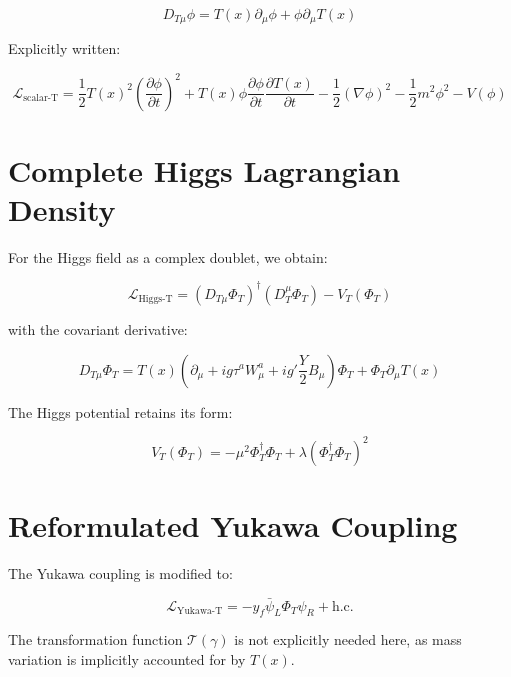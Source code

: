 \documentclass{article}
\begin{document}
	\begin{equation}
		D_{T\mu} \phi = T(x) \partial_\mu \phi + \phi \partial_\mu T(x)
	\end{equation}
	
	Explicitly written:
	
	\begin{equation}
		\mathcal{L}_{\text{scalar-T}} = \frac{1}{2} T(x)^2 \left( \frac{\partial \phi}{\partial t} \right)^2 + T(x) \phi \frac{\partial \phi}{\partial t} \frac{\partial T(x)}{\partial t} - \frac{1}{2} (\nabla \phi)^2 - \frac{1}{2} m^2 \phi^2 - V(\phi)
	\end{equation}
	
	\section{Complete Higgs Lagrangian Density}
	For the Higgs field as a complex doublet, we obtain:
	
	\begin{equation}
		\mathcal{L}_{\text{Higgs-T}} = (D_{T\mu} \Phi_T)^\dagger (D_T^\mu \Phi_T) - V_T(\Phi_T)
	\end{equation}
	
	with the covariant derivative:
	
	\begin{equation}
		D_{T\mu} \Phi_T = T(x) (\partial_\mu + i g \tau^a W_\mu^a + i g' \frac{Y}{2} B_\mu) \Phi_T + \Phi_T \partial_\mu T(x)
	\end{equation}
	
	The Higgs potential retains its form:
	
	\begin{equation}
		V_T(\Phi_T) = -\mu^2 \Phi_T^\dagger \Phi_T + \lambda (\Phi_T^\dagger \Phi_T)^2
	\end{equation}
	
	\section{Reformulated Yukawa Coupling}
	The Yukawa coupling is modified to:
	
	\begin{equation}
		\mathcal{L}_{\text{Yukawa-T}} = -y_f \bar{\psi}_L \Phi_T \psi_R + \text{h.c.}
	\end{equation}
	
	The transformation function \( \mathcal{T}(\gamma) \) is not explicitly needed here, as mass variation is implicitly accounted for by \( T(x) \).
	
\end{document}
